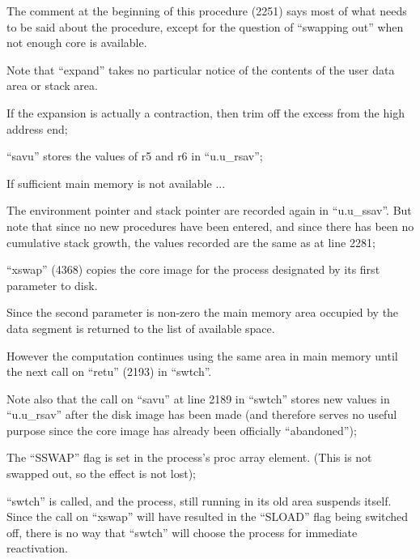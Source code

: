 
The comment at the beginning of this
procedure (2251) says most of what
needs to be said about the procedure,
except for the question of ``swapping
out'' when not enough core is available.

Note that ``expand'' takes no particular
notice of the contents of the user data
area or stack area.

\bd
\item[2277:] If the expansion is actually a
 contraction, then trim off the
 excess from the high address end;

\item[2281:] ``savu'' stores the values of r5
 and r6 in ``u.u\_rsav'';

\item[2283:] If sufficient main memory is not
 available ...

\item[2284:] The environment pointer and stack
 pointer are recorded again in
 ``u.u\_ssav''. But note that since
 no new procedures have been
 entered, and since there has been
 no cumulative stack growth, the
 values recorded are the same as
 at line 2281;

\item[2285:] ``xswap'' (4368) copies the core
 image for the process designated
 by its first parameter to disk.

Since the second parameter is
non-zero the main memory area
occupied by the data segment is
returned to the list of available
space.

However the computation continues
using the same area in main
memory until the next call on
``retu'' (2193) in ``swtch''.
\ed

Note also that the call on ``savu'' at
line 2189 in ``swtch'' stores new values
in ``u.u\_rsav'' after the disk image has
been made (and therefore serves no useful purpose since the core image has
already been officially ``abandoned'');

\bd
\item[2286:] The ``SSWAP'' flag is set in the
 process's proc array element.
 (This is not swapped out, so the
 effect is not lost);

\item[2287:] ``swtch'' is called, and the process, still running in its old
 area suspends itself. Since the
 call on ``xswap'' will have
 resulted in the ``SLOAD'' flag
 being switched off, there is no
 way that ``swtch'' will choose the
 process for immediate reactivation.
\ed

